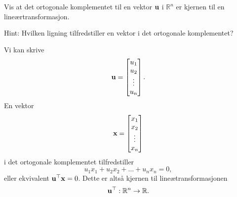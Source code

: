 

\begin{oppgave}
Vis at det ortogonale komplementet til en vektor $\mathbf{u}$ i $\mathbb{R}^n$ er kjernen til en lineærtransformasjon.

\noindent
Hint: Hvilken ligning tilfredstiller en vektor i det ortogonale komplementet?

\end{oppgave}

\begin{losning}
Vi kan skrive $$\mathbf{u}=\begin{bmatrix}
u_1\\
u_2\\
\vdots\\
u_n\\
\end{bmatrix}.$$ En vektor $$\mathbf{x}=\begin{bmatrix}
x_1\\
x_2\\
\vdots\\
x_n\\
\end{bmatrix}$$ i det ortogonale komplementet tilfredstiller $$u_1x_1+u_2x_2+\dots +u_nx_n=0,$$ eller ekvivalent $\mathbf{u}^\top \mathbf{x}=0$. Dette er altså kjernen til lineætransformasjonen $$\mathbf{u}^\top:\mathbb{R}^n\rightarrow \mathbb{R}.$$

\end{losning}